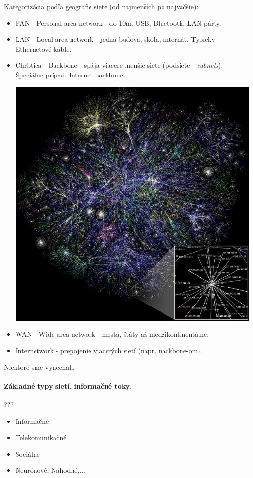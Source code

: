 Kategorizácia podľa geografie siete (od najmenších po najväčšie):
\begin{itemize}
\item PAN - Personal area network - do 10m. USB, Bluetooth, LAN párty.           
\item LAN - Local area network - jedna budova, škola, internát. Typicky Ethernetové káble.  
\item Chrbtica - Backbone - spája viacere menšie siete (podsiete - \emph{subnets}). Špeciálne prípad: Internet backbone.
\begin{center}
\includegraphics{backbone.jpg}
\end{center} 
\item WAN - Wide area network - mestá, štáty až medzikontinentálne. 
\item Internetwork - prepojenie viacerých sietí (napr. nackbone-om).
\end{itemize}
Niektoré sme vynechali. 

\paragraph{Základné typy sietí, informačné toky.}  
???
\begin{itemize}
\item Informačné 
\item Telekomunikačné
\item Sociálne
\item Neurónové, Náhodné,...            
\end{itemize}

